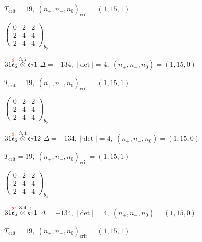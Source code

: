 \documentclass[10pt]{article}
\begin{document}
\hspace{1em}$T_{\text{crit}}=19,\; (n_+,n_-,n_0)_{\text{crit}}=(1,15,1)$

\hspace{2em}$\left(\begin{smallmatrix}0 & 2 & 2 \\ 2 & 4 & 4 \\ 2 & 4 & 4\end{smallmatrix}\right)_{\!b_0}$

\smallskip

$31\overset{\textcolor{red}{3}1}{\mathfrak{e}_6}\overset{3,5}{\otimes}\mathfrak{e}_71$ \quad $\Delta=-134,\; |\det|=4,\; (n_+,n_-,n_0)=(1,15,0)$

\hspace{1em}$T_{\text{crit}}=19,\; (n_+,n_-,n_0)_{\text{crit}}=(1,15,1)$

\hspace{2em}$\left(\begin{smallmatrix}0 & 2 & 2 \\ 2 & 4 & 4 \\ 2 & 4 & 4\end{smallmatrix}\right)_{\!b_0}$

\smallskip

$31\overset{\textcolor{red}{3}1}{\mathfrak{e}_6}\overset{3,4}{\otimes}\mathfrak{e}_712$ \quad $\Delta=-134,\; |\det|=4,\; (n_+,n_-,n_0)=(1,15,0)$

\hspace{1em}$T_{\text{crit}}=19,\; (n_+,n_-,n_0)_{\text{crit}}=(1,15,1)$

\hspace{2em}$\left(\begin{smallmatrix}0 & 2 & 2 \\ 2 & 4 & 4 \\ 2 & 4 & 4\end{smallmatrix}\right)_{\!b_0}$

\smallskip

$31\overset{\textcolor{red}{3}1}{\mathfrak{e}_6}\overset{3,4}{\otimes}\overset{1}{\mathfrak{e}_7}1$ \quad $\Delta=-134,\; |\det|=4,\; (n_+,n_-,n_0)=(1,15,0)$

\hspace{1em}$T_{\text{crit}}=19,\; (n_+,n_-,n_0)_{\text{crit}}=(1,15,1)$
\end{document}

